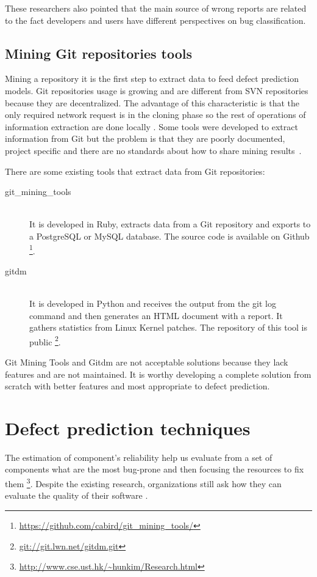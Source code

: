 These researchers also pointed that the main source of wrong reports are related to the fact developers and users have different perspectives on bug classification.

\subsection{Mining Git repositories tools}
Mining a repository it is the first step to extract data to feed defect prediction models. Git repositories usage is growing and are different from SVN repositories because they are decentralized. The advantage of this characteristic is that the only required network request is in the cloning phase so the rest of operations of information extraction are done locally \cite{Sadowski2011}. Some tools were developed to extract information from Git but the problem is that they are poorly documented, project specific and there are no standards about how to share mining results~\cite{Carlsson638844}.

There are some existing tools that extract data from Git repositories:

\begin{description}
    \item[git\_mining\_tools] \hfill \\
    It is developed in Ruby, extracts data from a Git repository and exports to a PostgreSQL or MySQL database. The source code is available on Github \footnote{\url{https://github.com/cabird/git_mining_tools/}}. 
    
    \item[gitdm] \hfill \\  
    It is developed in Python and receives the output from the git log command and then generates an HTML document with a report. It gathers statistics from Linux Kernel patches. The repository of this tool is public \footnote{\url{git://git.lwn.net/gitdm.git}}.
\end{description}

Git Mining Tools and Gitdm are not acceptable solutions because they lack features and are not maintained. It is worthy developing a complete solution from scratch with better features and most appropriate to defect prediction.

\section{Defect prediction techniques}
The estimation of component's reliability help us evaluate from a set of components what are the most bug-prone and then focusing the resources to fix them \footnote{\url{http://www.cse.ust.hk/~hunkim/Research.html}}. Despite the existing research, organizations still ask how they can evaluate the quality of their software \cite{815326}. 

